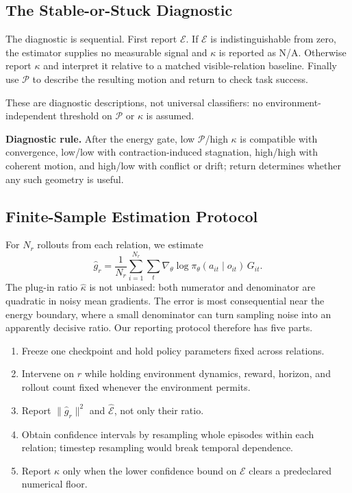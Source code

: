 \documentclass[letterpaper]{article}
\begin{document}
\subsection{The Stable-or-Stuck Diagnostic}

The diagnostic is sequential.
First report $\mathcal{E}$.
If $\mathcal{E}$ is indistinguishable from zero, the estimator supplies no measurable signal and $\kappa$ is reported as N/A.
Otherwise report $\kappa$ and interpret it relative to a matched visible-relation baseline.
Finally use $\mathcal{P}$ to describe the resulting motion and return to check task success.

These are diagnostic descriptions, not universal classifiers: no environment-independent threshold on $\mathcal{P}$ or $\kappa$ is assumed.

\noindent\textbf{Diagnostic rule.}
After the energy gate, low $\mathcal{P}$/high $\kappa$ is compatible with convergence, low/low with contraction-induced stagnation, high/high with coherent motion, and high/low with conflict or drift; return determines whether any such geometry is useful.

\subsection{Finite-Sample Estimation Protocol}

For $N_r$ rollouts from each relation, we estimate
\begin{equation}
\widehat g_r
=
\frac{1}{N_r}\sum_{i=1}^{N_r}
\sum_t
\nabla_\theta\log\pi_\theta(a_{it}\mid o_{it})\,G_{it}.
\label{eq:estimator}
\end{equation}
The plug-in ratio $\widehat\kappa$ is not unbiased: both numerator and denominator are quadratic in noisy mean gradients.
The error is most consequential near the energy boundary, where a small denominator can turn sampling noise into an apparently decisive ratio.
Our reporting protocol therefore has five parts.

\begin{enumerate}
\item Freeze one checkpoint and hold policy parameters fixed across relations.
\item Intervene on $r$ while holding environment dynamics, reward, horizon, and rollout count fixed whenever the environment permits.
\item Report $\|\widehat g_r\|^2$ and $\widehat{\mathcal{E}}$, not only their ratio.
\item Obtain confidence intervals by resampling whole episodes within each relation; timestep resampling would break temporal dependence.
\item Report $\kappa$ only when the lower confidence bound on $\mathcal{E}$ clears a predeclared numerical floor.
\end{enumerate}
\end{document}
